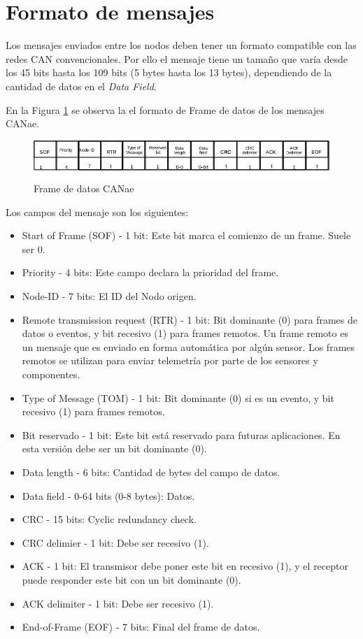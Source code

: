 \section{Formato de mensajes}
Los mensajes enviados entre los nodos deben tener un formato compatible con las
redes CAN convencionales. Por ello el mensaje tiene un tamaño que varía desde
los 45 bits hasta los 109 bits (5 bytes hasta los 13 bytes), dependiendo de la cantidad de datos en el
\textit{Data Field}.

En la Figura \ref{fig:Data_Frame} se observa la el formato de Frame de datos de
los mensajes CANae.

\begin{figure}[h!]
 \centering
 \includegraphics[scale=0.6]{images/Secciones/AppendixA/Data_Frame.jpg}
  \caption{Frame de datos CANae}
\label{fig:Data_Frame}
\end{figure}

Los campos del mensaje son los siguientes:

\begin{itemize}
\item Start of Frame (SOF) - 1 bit: Este bit marca el comienzo de un frame.
  Suele ser 0.
\item Priority - 4 bits: Este campo declara la prioridad del frame. 
\item Node-ID - 7 bits: El ID del Nodo origen.
\item Remote transmission request (RTR) - 1 bit: Bit dominante (0) para frames
  de datos o eventos, y bit recesivo (1) para frames remotos. Un frame remoto
  es un mensaje que es enviado en forma automática por algún sensor. Los frames
  remotos se utilizan para enviar telemetría por parte de los sensores y
  componentes.
\item Type of Message (TOM) - 1 bit: Bit dominante (0) si es un evento, y bit
  recesivo (1) para frames remotos.
\item Bit reservado - 1 bit: Este bit está reservado para futuras aplicaciones.
  En esta versión debe ser un bit dominante (0).
\item Data length - 6 bits: Cantidad de bytes del campo de datos.
\item Data field - 0-64 bits (0-8 bytes): Datos.
\item CRC - 15 bits: Cyclic redundancy check.
\item CRC delimier - 1 bit: Debe ser recesivo (1).
\item ACK - 1 bit: El transmisor debe poner este bit en recesivo (1), y el
  receptor puede responder este bit con un bit dominante (0).
\item ACK delimiter - 1 bit: Debe ser recesivo (1).
\item End-of-Frame (EOF) - 7 bits: Final del frame de datos.
\end{itemize}

